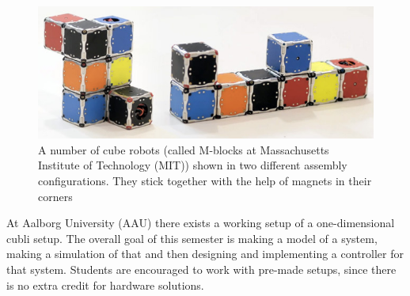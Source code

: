 \begin{figure}[H] 
	\centering 
	\includegraphics[scale=0.4]{figures/m-blocks}
	\caption{A number of cube robots (called M-blocks at Massachusetts Institute of Technology (MIT)) shown in two different assembly configurations. They stick together with the help of magnets in their corners\cite{LRosen}}
	\label{MBlocksExample}
\end{figure} 
At Aalborg University (AAU) there exists a working setup of a one-dimensional cubli setup. The overall goal of this semester is making a model of a system, making a simulation of that and then designing and implementing a controller for that system. Students are encouraged to work with pre-made setups, since there is no extra credit for hardware solutions.






